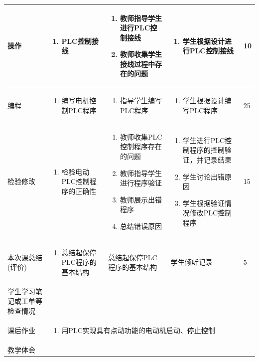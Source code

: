 {\begin{landscape}
\begin{longtable}{|m{10mm}|m{50mm}|m{50mm}|m{50mm}|m{15mm}|}
操作&
\begin{enumerate}
\item PLC控制接线
\end{enumerate} &\begin{enumerate}
\item 教师指导学生进行PLC控制接线
\item 教师收集学生接线过程中存在的问题
\end{enumerate} &\begin{enumerate}
\item 学生根据设计进行PLC控制接线
\end{enumerate} &10 \\\hline
编程&
\begin{enumerate}
\item 编写电机控制PLC程序
\end{enumerate} &\begin{enumerate}
\item 指导学生编写PLC程序
\end{enumerate} &\begin{enumerate}
\item 学生根据设计编写PLC程序
\end{enumerate} &25 \\\hline
\centering 检验修改&\begin{enumerate}
\item 检验电动PLC控制程序的正确性
\end{enumerate}&\begin{enumerate}
\item 教师收集PLC控制程序存在的问题
\item 教师指导学生进行程序验证
\item 教师展示出错程序
\item 总结错误原因
\end{enumerate}&\begin{enumerate}
\item 学生进行PLC控制程序的控制验证，并记录结果
\item 学生讨论出错原因
\item 学生根据验证情况修改PLC控制程序
\end{enumerate}&15 \\\hline
\centering 本次课总结(评价)&\begin{enumerate}
\item 总结起保停PLC程序的基本结构 
\end{enumerate}&总结起保停PLC程序的基本结构  &学生倾听记录 &5 \\\hline
\centering 学生学习笔记或工单等检查情况&\multicolumn{4}{m{165mm}|}{\quad}\\\hline
\centering 课后作业&\multicolumn{4}{m{165mm}|}{\begin{enumerate}
\item 用PLC实现具有点动功能的电动机启动、停止控制
\end{enumerate}}\\\hline
\centering 教学体会&\multicolumn{4}{m{165mm}|}{\quad}\\
\end{longtable}


\end{landscape}}
